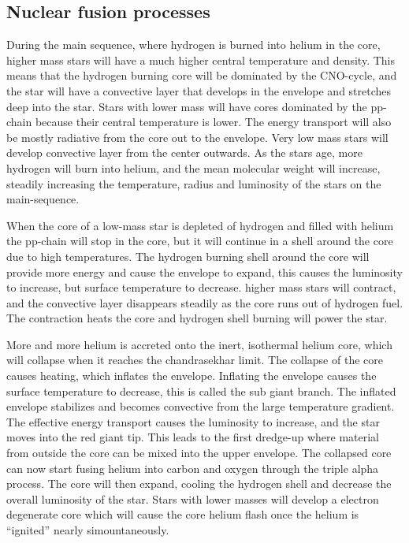 \subsection{Nuclear fusion processes}
During the main sequence, where hydrogen is burned into helium in the core, higher mass stars will have a much higher central temperature and density. This means that the hydrogen burning core will be dominated by the CNO-cycle, and the star will have a convective layer that develops in the envelope and stretches deep into the star.
Stars with lower mass will have cores dominated by the pp-chain because their central temperature is lower. The energy transport will also be mostly radiative from the core out to the envelope.
Very low mass stars will develop convective layer from the center outwards.
As the stars age, more hydrogen will burn into helium, and the mean molecular weight will increase, steadily increasing the temperature, radius and luminosity of the stars on the main-sequence.

When the core of a low-mass star is depleted of hydrogen and filled with helium the pp-chain will stop in the core, but it will continue in a shell around the core due to high temperatures. The hydrogen burning shell around the core will provide more energy and cause the envelope to expand, this causes the luminosity to increase, but surface temperature to decrease.
higher mass stars will contract, and the convective layer disappears steadily as the core runs out of hydrogen fuel. The contraction heats the core and hydrogen shell burning will power the star.

More and more helium is accreted onto the inert, isothermal helium core, which will collapse when it reaches the chandrasekhar limit.
The collapse of the core causes heating, which inflates the envelope.
Inflating the envelope causes the surface temperature to decrease, this is called the sub giant branch.
The inflated envelope stabilizes and becomes convective from the large temperature gradient.
The effective energy transport causes the luminosity to increase, and the star moves into the red giant tip.
This leads to the first dredge-up where material from outside the core can be mixed into the upper envelope.
The collapsed core can now start fusing helium into carbon and oxygen through the triple alpha process.
The core will then expand, cooling the hydrogen shell and decrease the overall luminosity of the star. Stars with lower masses will develop a electron degenerate core which will cause the core helium flash once the helium is ``ignited'' nearly simountaneously.

